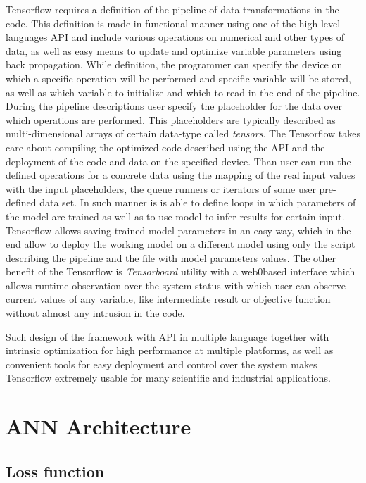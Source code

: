 Tensorflow requires a definition of the pipeline of data transformations in the code.
This definition is made in functional manner using one of the high-level languages API and include various operations on numerical and other types of data, as well as easy means to update and optimize variable parameters using back propagation. 
While definition, the programmer can specify the device on which a specific operation will be performed and specific variable will be stored, as well as which variable to initialize and which to read in the end of the pipeline. 
During the pipeline descriptions user specify the placeholder for the data over which operations are performed. 
This placeholders are typically described as multi-dimensional arrays of certain data-type called \textit{tensors}.
The Tensorflow takes care about compiling the optimized code described using the API and the deployment of the code and data on the specified device. 
Than user can run the defined operations for a concrete data using the mapping of the real input values with the input placeholders, the queue runners or iterators of some user pre-defined data set.
In such manner is is able to define loops in which parameters of the model are trained as well as to use model to infer results for certain input.
Tensorflow allows saving trained model parameters in an easy way, which in the end allow to deploy the working model on a different model using only the script describing the pipeline and the file with model parameters values.
The other benefit of the Tensorflow is \textit{Tensorboard} utility with a web0based interface which allows runtime observation over the system status with which user can observe current values of any variable, like intermediate result or objective function without almost any intrusion in the code.

Such design of the framework with API in multiple language together with intrinsic optimization for high performance at multiple platforms, as well as convenient tools for easy deployment and control over the system makes Tensorflow extremely usable for many scientific and industrial applications.


\section{ANN Architecture}

\subsection{Loss function}

